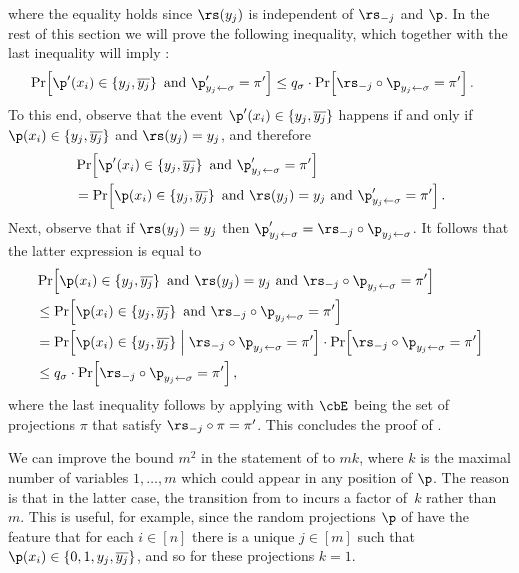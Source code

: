 \documentclass{toc}
\begin{document}
where the equality holds since $\rs(y_{j})$ is independent of $\rs_{-j}$
and $\p$. In the rest of this section we will prove the following
inequality, which together with the last inequality will imply :
\begin{align}
\Pr\!\left[\p'(x_{i})\in\left\{ y_{j},\overline{y_{j}}\right\} \text{ and }\p_{y_{j}\gets\sigma}'=\pi'\right] & \le q_{\sigma}\cdot\Pr\!\left[\rs_{-j}\circ\p_{y_{j}\gets\sigma}=\pi'\right].\label{eq:shrinkage-hiding-auxiliary-goal}
\end{align}
To this end, observe that the event $\p'(x_{i})\in\left\{ y_{j},\overline{y_{j}}\right\} $
happens if and only if $\p(x_{i})\in\left\{ y_{j},\overline{y_{j}}\right\} $
and $\rs(y_{j})=y_{j}$, and therefore 
\begin{align*}
 & \Pr\!\left[\p'(x_{i})\in\left\{ y_{j},\overline{y_{j}}\right\} \text{ and }\p_{y_{j}\gets\sigma}'=\pi'\right]\\
 & =\Pr\!\left[\p(x_{i})\in\left\{ y_{j},\overline{y_{j}}\right\} \text{ and }\rs(y_{j})=y_{j}\text{ and }\p_{y_{j}\gets\sigma}'=\pi'\right].
\end{align*}
Next, observe that if $\rs(y_{j})=y_{j}$ then $\p_{y_{j}\gets\sigma}'=\rs_{-j}\circ\p_{y_{j}\gets\sigma}$.
It follows that the latter expression is equal to 
\begin{align*}
 & \Pr\!\left[\p(x_{i})\in\left\{ y_{j},\overline{y_{j}}\right\} \text{ and }\rs(y_{j})=y_{j}\text{ and }\rs_{-j}\circ\p_{y_{j}\gets\sigma}=\pi'\right]\\
 & \le\Pr\!\left[\p(x_{i})\in\left\{ y_{j},\overline{y_{j}}\right\} \text{ and }\rs_{-j}\circ\p_{y_{j}\gets\sigma}=\pi'\right]\\
 & =\Pr\!\left[\p(x_{i})\in\left\{ y_{j},\overline{y_{j}}\right\} \;\middle|\;\rs_{-j}\circ\p_{y_{j}\gets\sigma}=\pi'\right]\cdot\Pr\!\left[\rs_{-j}\circ\p_{y_{j}\gets\sigma}=\pi'\right]\\
 & \le q_{\sigma}\cdot\Pr\!\left[\rs_{-j}\circ\p_{y_{j}\gets\sigma}=\pi'\right],
\end{align*}
where the last inequality follows by applying 
with $\cbE$ being the set of projections $\pi$ that satisfy $\rs_{-j}\circ\pi=\pi'$.
This concludes the proof of .
\begin{remark}
We can improve the bound $m^{2}$ in the statement of 
to $mk$, where $k$ is the maximal number of variables $1,\ldots,m$
which could appear in any position of $\p$. The reason is that in
the latter case, the transition from 
to  incurs a factor
of~$k$ rather than~$m$. This is useful, for example, since the
random projections $\p$ of  have the feature that
for each $i\in[n]$ there is a unique $j\in[m]$ such that $\p(x_{i})\in\{0,1,y_{j},\overline{y_{j}}\}$,
and so for these projections $k=1$. 
\end{remark}
\end{document}
